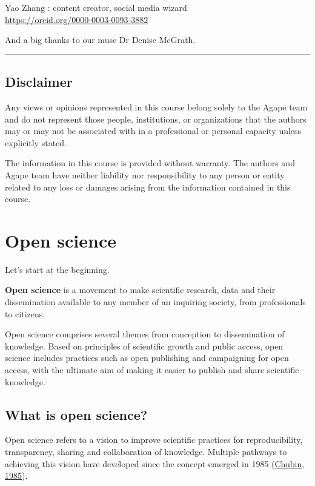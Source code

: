 \documentclass[
]{book}
\begin{document}
Yao Zhang : content creator, social media wizard\\
\url{https://orcid.org/0000-0003-0093-3882}

And a big thanks to our muse Dr Denise McGrath.

\begin{center}\rule{0.5\linewidth}{0.5pt}\end{center}

\hypertarget{disclaimer}{%
\section*{Disclaimer}\label{disclaimer}}

Any views or opinions represented in this course belong solely to the Agape team and do not represent those people, institutions, or organizations that the authors may or may not be associated with in a professional or personal capacity unless explicitly stated.

The information in this course is provided without warranty. The authors and Agape team have neither liability nor responsibility to any person or entity related to any loss or damages arising from the information contained in this course.

\hypertarget{open-science}{%
\chapter{Open science}\label{open-science}}

Let's start at the beginning.

\textbf{Open science} is a movement to make scientific research, data and their dissemination available to any member of an inquiring society, from professionals to citizens.

Open science comprises several themes from conception to dissemination of knowledge. Based on principles of scientific growth and public access, open science includes practices such as open publishing and campaigning for open access, with the ultimate aim of making it easier to publish and share scientific knowledge.

\hypertarget{what-is-open-science}{%
\section{What is open science?}\label{what-is-open-science}}

Open science refers to a vision to improve scientific practices for reproducibility, transparency, sharing and collaboration of knowledge. Multiple pathways to achieving this vision have developed since the concept emerged in 1985 (\href{https://journals.sagepub.com/doi/10.1177/016224398501000211}{Chubin, 1985}).
\end{document}
